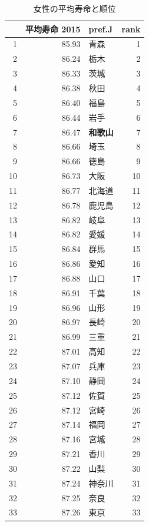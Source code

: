\begin{table}[ht]
\caption{女性の平均寿命と順位}
\centering
\footnotesize
\begin{tabular}{rrlr}
  \hline
 & 平均寿命 2015 & pref.J & rank \\
  \hline
1 & 85.93 & 青森 &   1 \\
  2 & 86.24 & 栃木 &   2 \\
  3 & 86.33 & 茨城 &   3 \\
  4 & 86.38 & 秋田 &   4 \\
  5 & 86.40 & 福島 &   5 \\
  6 & 86.44 & 岩手 &   6 \\
  7 & 86.47 & \textbf{和歌山} &   7 \\
  8 & 86.66 & 埼玉 &   8 \\
  9 & 86.66 & 徳島 &   9 \\
  10 & 86.73 & 大阪 &  10 \\
  11 & 86.77 & 北海道 &  11 \\
  12 & 86.78 & 鹿児島 &  12 \\
  13 & 86.82 & 岐阜 &  13 \\
  14 & 86.82 & 愛媛 &  14 \\
  15 & 86.84 & 群馬 &  15 \\
  16 & 86.86 & 愛知 &  16 \\
  17 & 86.88 & 山口 &  17 \\
  18 & 86.91 & 千葉 &  18 \\
  19 & 86.96 & 山形 &  19 \\
  20 & 86.97 & 長崎 &  20 \\
  21 & 86.99 & 三重 &  21 \\
  22 & 87.01 & 高知 &  22 \\
  23 & 87.07 & 兵庫 &  23 \\
  24 & 87.10 & 静岡 &  24 \\
  25 & 87.12 & 佐賀 &  25 \\
  26 & 87.12 & 宮崎 &  26 \\
  27 & 87.14 & 福岡 &  27 \\
  28 & 87.16 & 宮城 &  28 \\
  29 & 87.21 & 香川 &  29 \\
  30 & 87.22 & 山梨 &  30 \\
  31 & 87.24 & 神奈川 &  31 \\
  32 & 87.25 & 奈良 &  32 \\
  33 & 87.26 & 東京 &  33 \\

\end{tabular}
\end{table}
